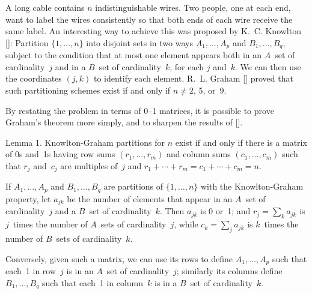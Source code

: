 {\baselineskip14pt

\meno
A  long cable contains $n$ indistinguishable wires. Two people, one at each
end, want to label the wires consistently so that both ends of each wire
receive the same label. An interesting way to achieve this was proposed by
K.~C. Knowlton
[\GK]:
Partition $\{1,\ldots,n\}$ into disjoint sets in two ways $A_1,\ldots,A_p$ and
$B_1,\ldots,B_q$, subject to the condition that at most one element appears
both in an $A$~set of cardinality~$j$ and in a $B$~set of cardinality~$k$, for
each $j$ and~$k$. We can then use the coordinates $(j,k)$ to identify each
element. R.~L. Graham
[\GR]
proved that such partitioning schemes exist if and only if $n\neq 2$, 5, or~9.

By restating the problem in terms of 0--1 matrices, it is possible to prove
Graham's theorem more simply, and to sharpen the results of
[\GR].

\proclaim
Lemma 1. Knowlton-Graham partitions for $n$ exist if and only if there is a
matrix of 0s and~1s having row sums $(r_1,\ldots,r_m)$ and column sums
$(c_1,\ldots,c_m)$ such that $r_j$ and~$c_j$ are multiples of~$j$ and
$r_1+\cdots +r_m=c_1+\cdots +c_m=n$.

\proof
If $A_1,\ldots,A_p$ and $B_1,\ldots,B_q$ are partitions of $\{1,\ldots,n\}$
with the Knowlton-Graham property, let $a_{jk}$ be the number of elements that
appear in an $A$~set of cardinality~$j$ and a $B$~set of cardinality~$k$. Then
$a_{jk}$ is 0 or~1; and $r_j=\sum_ka_{jk}$ is $j$~times the number of $A$~sets
of cardinality~$j$, while $c_k=\sum_ja_{jk}$ is $k$~times the number of
$B$~sets of cardinality~$k$.

Conversely, given such a matrix, we can use its rows
to define $A_1,\ldots,A_p$ such that each~1 in row~$j$ is in an $A$~set
of cardinality~$j$; similarly its columns define $B_1,\ldots,B_q$
such that each~1 in column~$k$ is in a $B$~set of cardinality~$k$. \ \pfbox

}

